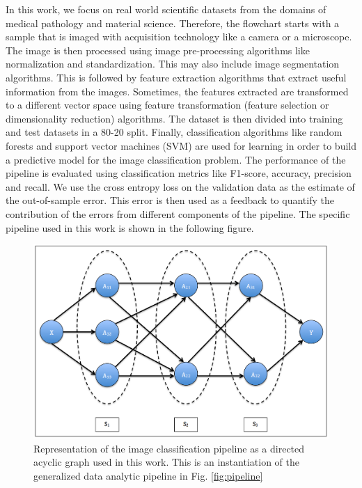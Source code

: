 In this work, we focus on real world scientific datasets from the domains of medical pathology and material science.  Therefore, the flowchart starts with a sample that is imaged with acquisition technology like a camera or a microscope. The image is then processed using image pre-processing algorithms like normalization and standardization. This may also include image segmentation algorithms. This is followed by feature extraction algorithms that extract useful information from the images. Sometimes, the features extracted are transformed to a different vector space using feature transformation (feature selection or dimensionality reduction) algorithms. The dataset is then divided into training and test datasets in a 80-20 split. Finally, classification algorithms like random forests \cite{breiman2001random} and support vector machines (SVM) \cite{cortes1995support} are used for learning in order to build a predictive model for the image classification problem. The performance of the pipeline is evaluated using classification metrics like F1-score, accuracy, precision and recall. We use the cross entropy loss on the validation data as the estimate of the out-of-sample error. This error is then used as a feedback to quantify the contribution of the errors from different components of the pipeline. The specific pipeline used in this work is shown in the following figure.

\begin{figure}[ht!]
    \centering
    \includegraphics[scale=0.3]{img/EP/pipeline}
    \caption{Representation of the image classification pipeline as a directed acyclic graph used in this work. This is an instantiation of the generalized data analytic pipeline in Fig. \ref{fig:pipeline}}
    \label{fig:images_pipeline}
\end{figure}

